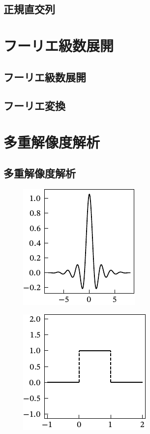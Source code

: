 \documentclass[../../main]{subfiles}
\begin{document}
\subsection{正規直交列}

\section{フーリエ級数展開}
\subsection{フーリエ級数展開}
\subsection{フーリエ変換}

\section{多重解像度解析}
\subsection{多重解像度解析}

\begin{figure}[htbp]
  \centering
  \includegraphics{meyer_scaling.pdf}
\end{figure}

\begin{figure}[htbp]
  \centering
  \includegraphics{haar_scaling.pdf}
\end{figure}
\end{document}
